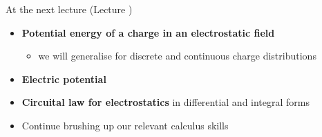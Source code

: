 
%
%

\renewcommand{\lecturesummarytitle}{Main points to remember }


%
%

\begin{frame}{At the next lecture (Lecture \nextlecture)}

\begin{itemize}
  \item {\bf Potential energy of a charge in an electrostatic field}
    \begin{itemize}
       \item we will generalise for discrete and continuous charge distributions
    \end{itemize}

  \vspace{0.4cm}
  \item {\bf Electric potential}

  \vspace{0.4cm}
  \item {\bf Circuital law for electrostatics} in differential and integral forms

  \vspace{0.4cm}
  \item Continue brushing up our relevant calculus skills

\end{itemize}

\end{frame}
